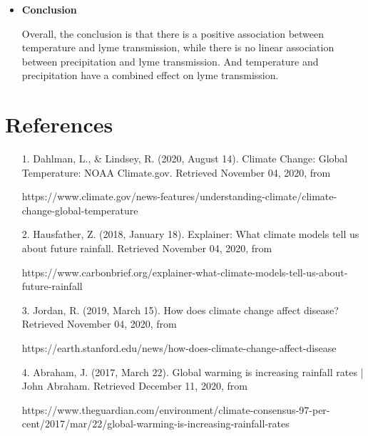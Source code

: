 \documentclass[fontsize=11pt]{article}
\begin{document}
\begin{itemize}
  \newpage
  \item \textbf{Conclusion}
  
Overall, the conclusion is that there is a positive association between temperature and lyme transmission, while there is no linear association between precipitation and lyme transmission. And  temperature and precipitation have a combined effect on lyme transmission.

\end{itemize}



\section*{References}
\begin{itemize}
  \item [1.] Dahlman, L., \& Lindsey, R. (2020, August 14). Climate Change: Global Temperature: NOAA Climate.gov. Retrieved November 04, 2020, from 

  https://www.climate.gov/news-features/understanding-climate/climate-change-global-temperature
  \item [2.] Hausfather, Z. (2018, January 18). Explainer: What climate models tell us about future rainfall. Retrieved November 04, 2020, from 

  https://www.carbonbrief.org/explainer-what-climate-models-tell-us-about-future-rainfall
  \item[3.] Jordan, R. (2019, March 15). How does climate change affect disease? Retrieved November 04, 2020, from 

  https://earth.stanford.edu/news/how-does-climate-change-affect-disease
  
   \item[4.]Abraham, J. (2017, March 22). Global warming is increasing rainfall rates | John Abraham. Retrieved December 11, 2020, from
   
   
   https://www.theguardian.com/environment/climate-consensus-97-per-cent/2017/mar/22/global-warming-is-increasing-rainfall-rates
\end{itemize}   
\end{document}
